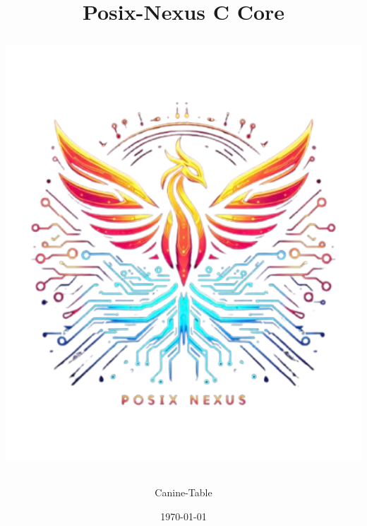 \documentclass[a4paper,12pt]{article}
\begin{document}
\title{
		\hspace{48px}\textbf{Posix-Nexus C Core}\\[10mm]
		\begin{NexMainBox}[dark, shpA,fit, width=\linewidth/2]
			\includegraphics[width=\textwidth]{img/posix-nexus.png}
		\end{NexMainBox}
	}
	\author{Canine-Table}
	\date{\today}
	\maketitle
	\newpage
	\begin{NexMainBox}[light, title=Contents, hdrB, breakable]
		\thispagestyle{plain}
		\tableofcontents
	\end{NexMainBox}
	\newpage
	
\end{document}
